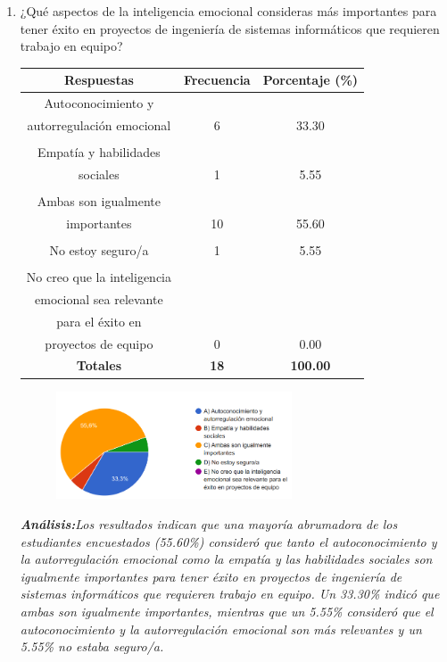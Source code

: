 \documentclass[journal]{IEEEtran}
\begin{document}
\begin{enumerate}
\item¿Qué aspectos de la inteligencia emocional consideras más importantes para tener éxito en proyectos de ingeniería de sistemas informáticos que requieren trabajo en equipo?
	\begin{table}[H]
		\renewcommand{\arraystretch}{1.3}
		\centering
		\begin{tabular}{c c c}
			\hline
			\textbf{Respuestas} & \textbf{Frecuencia} & \textbf{Porcentaje (\%)}\\
			\hline
			Autoconocimiento y \\autorregulación emocional  & 6 & 33.30 \\
			\\Empatía y habilidades \\sociales  & 1 & 5.55 \\
			\\Ambas son igualmente \\importantes  & 10 & 55.60\\
			\\No estoy seguro/a  & 1 & 5.55\\
			\\No creo que la inteligencia \\emocional sea relevante \\para el éxito en \\proyectos de equipo & 0 & 0.00\\
			\hline
			\textbf{Totales} &\textbf{18}& \textbf{100.00}\\
			\hline
		\end{tabular}
	\end{table}
	\begin{figure}[h]
		\centering
		\includegraphics[width=07cm]{Pregunta10}
	\end{figure}
	\textit{\textbf{Análisis:}Los resultados indican que una mayoría abrumadora de los estudiantes encuestados (55.60\%) consideró que tanto el autoconocimiento y la autorregulación emocional como la empatía y las habilidades sociales son igualmente importantes para tener éxito en proyectos de ingeniería de sistemas informáticos que requieren trabajo en equipo.
Un 33.30\% indicó que ambas son igualmente importantes, mientras que un 5.55\% consideró que el autoconocimiento y la autorregulación emocional son más relevantes y un 5.55\% no estaba seguro/a.
}
\end{enumerate}
\end{document}
